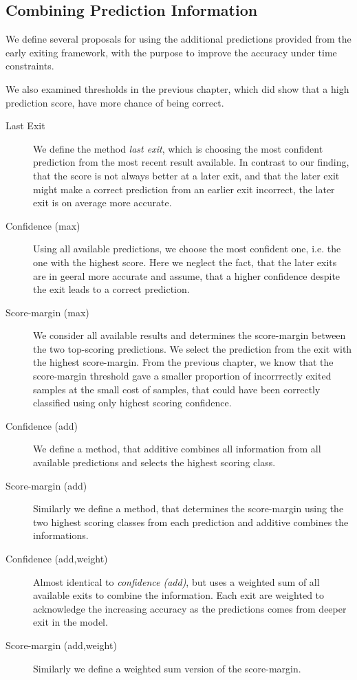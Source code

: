 \subsection{Combining Prediction Information}

We define several proposals for using the additional predictions provided from the early exiting framework, with the purpose to improve the accuracy under time constraints. 




We also examined thresholds in the previous chapter, which did show that a high prediction score, have more chance of being correct.       

\begin{description}
	\item[Last Exit] We define the method \emph{last exit}, which is choosing the most confident prediction from the most recent result available. In contrast to our finding, that the score is not always better at a later exit, and that the later exit might make a correct prediction from an earlier exit incorrect, the later exit is on average more accurate.
	\item[Confidence (max)] Using all available predictions, we choose the most confident one, i.e. the one with the highest score. Here we neglect the fact, that the later exits are in geeral more accurate and assume, that a higher confidence despite the exit leads to a correct prediction.
	\item[Score-margin (max)] We consider all available results and determines the score-margin between the two top-scoring predictions. We select the prediction from the exit with the highest score-margin. From the previous chapter, we know that the score-margin threshold gave a smaller proportion of incorrrectly exited samples at the small cost of samples, that could have been correctly classified using only highest scoring confidence.
	\item[Confidence (add)] We define a method, that additive combines all information from all available predictions and selects the highest scoring class. 
	\item[Score-margin (add)] Similarly we define a method, that determines the score-margin using the two highest scoring classes from each prediction and additive combines the informations.
	\item[Confidence (add,weight)] Almost identical to \emph{confidence (add)}, but uses a weighted sum of all available exits to combine the information. Each exit are weighted to acknowledge the increasing accuracy as the predictions comes from deeper exit in the model.  
	\item[Score-margin (add,weight)] Similarly we define a weighted sum version of the score-margin. 
\end{description}

